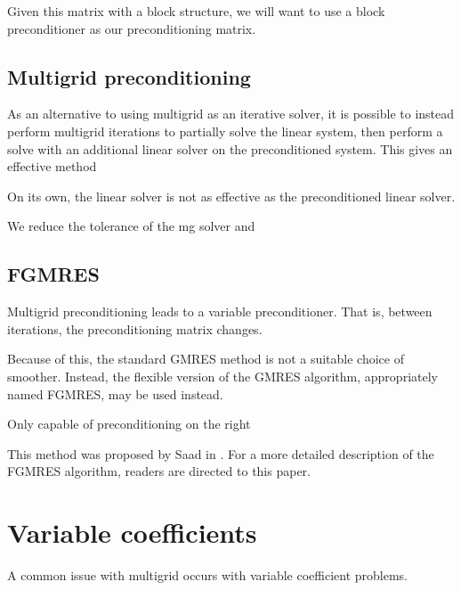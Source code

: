 Given this matrix with a block structure, we will want to use a block preconditioner as our preconditioning matrix.




\subsection{Multigrid preconditioning}

As an alternative to using multigrid as an iterative solver, it is possible to instead perform multigrid iterations to partially solve the linear system, then perform a solve with an additional linear solver on the preconditioned system.
This gives an effective method  

On its own, the linear solver is not as effective as the preconditioned linear solver.


We reduce the tolerance of the mg solver and 





\subsection{FGMRES}

Multigrid preconditioning leads to a variable preconditioner.
That is, between iterations, the preconditioning matrix changes.

Because of this, the standard GMRES method is not a suitable choice of smoother.
Instead, the flexible version of the GMRES algorithm, appropriately named FGMRES, may be used instead.

Only capable of preconditioning on the right


This method was proposed by Saad in \cite{fgmres}.
For a more detailed description of the FGMRES algorithm, readers are directed to this paper.







\section{Variable coefficients}

A common issue with multigrid occurs with variable coefficient problems.
\cite{briggs}

